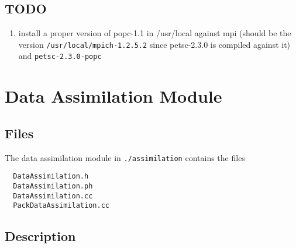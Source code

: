 \documentclass[12pt]{report}
\begin{document}
\section{TODO}
\begin{enumerate}
\item install a proper version of popc-1.1 in /usr/local against mpi
  (should be the version \verb+/usr/local/mpich-1.2.5.2+ since
  petsc-2.3.0 is compiled against it) and \verb+petsc-2.3.0-popc+
\end{enumerate}



\chapter{Data Assimilation Module}\label{ch:assimilation}

\section{Files}
The data assimilation module in \verb+./assimilation+
contains the files 
\begin{verbatim}
  DataAssimilation.h
  DataAssimilation.ph
  DataAssimilation.cc
  PackDataAssimilation.cc
\end{verbatim}


\section{Description}
\end{document}
